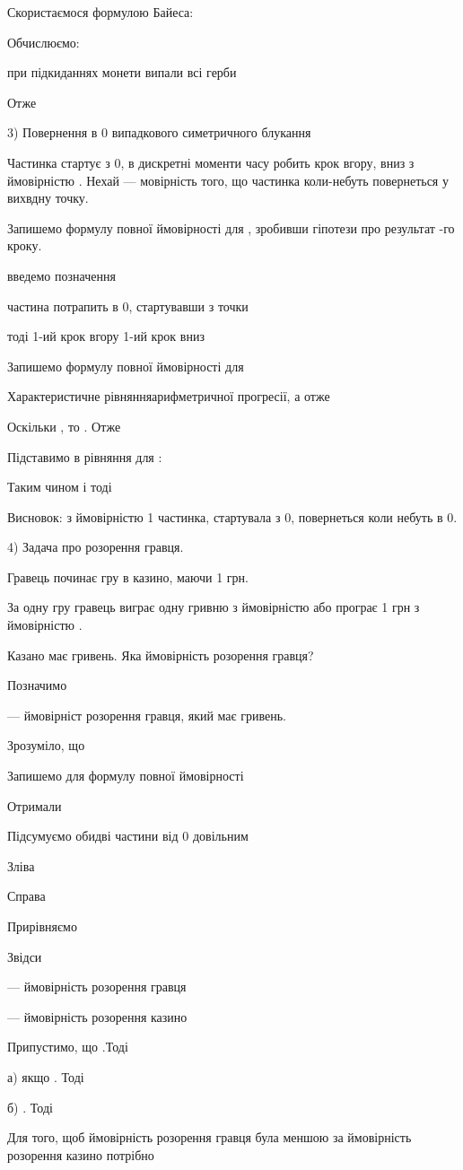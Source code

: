 Скористаємося формулою Байеса:

Обчислюємо:

при  підкиданнях монети випали всі герби

Отже

3) Повернення в 0 випадкового симетричного блукання

Частинка стартує з 0, в дискретні моменти часу  робить 
крок вгору, вниз з ймовірністю  . Нехай  --- мовірність
того, що частинка коли-небуть повернеться у вихвдну точку.

Запишемо формулу повної ймовірності для  , зробивши
гіпотези про результат -го кроку.

введемо позначення

частина потрапить в 0, стартувавши з точки 

тоді
1-ий крок вгору   1-ий крок вниз

Запишемо формулу повної ймовірності для 

Характеристичне рівнянняарифметричної прогресії, а отже

Оскільки  , то . Отже

Підставимо  в рівняння для :


Таким чином  і тоді

Висновок: з ймовірністю 1 частинка, стартувала з 0, повернеться коли небуть
в 0.


4) Задача про розорення гравця.

Гравець починає гру в казино, маючи 1 грн.

За одну гру гравець виграє одну гривню з ймовірністю 
або програє 1 грн з ймовірністю .

Казано має  гривень. Яка ймовірність розорення гравця?

Позначимо

--- ймовірніст розорення гравця, який має  гривень.

Зрозуміло, що 

Запишемо для  формулу повної ймовірності

Отримали

Підсумуємо обидві частини від 0 довільним

Зліва

Справа

Прирівняємо

Звідси

--- ймовірність розорення гравця

--- ймовірність розорення казино

Припустимо, що .Тоді 

а) якщо  . Тоді

б) . Тоді

Для того, щоб ймовірність розорення гравця була меншою
за ймовірність розорення казино потрібно 

